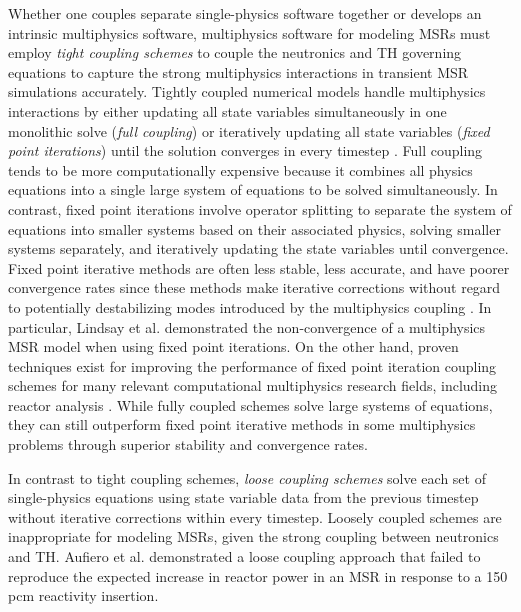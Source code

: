Whether one couples separate single-physics software together or develops an
intrinsic multiphysics software, multiphysics software for modeling \glspl{MSR} must employ
\textit{tight coupling schemes} to couple the neutronics
and \gls{TH} governing equations to capture the strong
multiphysics interactions in transient \gls{MSR} simulations accurately. Tightly coupled
numerical models handle multiphysics interactions by either updating all state
variables simultaneously in one monolithic solve (\textit{full coupling}) or
iteratively updating all state variables (\textit{fixed point iterations})
until the solution converges in every timestep \cite{keyes_multiphysics_2013}.
Full coupling tends to be more computationally expensive because it combines
all physics equations into a single large system of equations to be solved
simultaneously. In contrast, fixed point iterations involve operator splitting to
separate the system of equations into smaller systems based on their associated
physics, solving smaller systems separately, and iteratively updating the state
variables until convergence. Fixed point iterative methods are often less
stable, less accurate, and have poorer
convergence rates since these methods make iterative corrections
without regard to potentially destabilizing modes introduced by the
multiphysics coupling \cite{keyes_multiphysics_2013}. In particular, Lindsay et al.
\cite{lindsay_introduction_2018} demonstrated the non-convergence of a multiphysics \gls{MSR}
model when using fixed point iterations. On the other hand, proven
techniques exist for improving the performance of fixed point iteration
coupling schemes for many relevant computational multiphysics research fields,
including reactor analysis \cite{ragusa_consistent_2009}. While fully coupled
schemes solve large systems of equations, they can still outperform
fixed point iterative methods in some multiphysics problems through superior
stability and convergence rates. 

In contrast to tight coupling schemes, \textit{loose coupling schemes}
solve each set of single-physics equations using state variable
data from the previous timestep without iterative corrections within every
timestep. Loosely coupled schemes are inappropriate for modeling \glspl{MSR},
given the strong coupling between neutronics and \gls{TH}.
Aufiero et al. \cite{aufiero_development_2014} demonstrated a loose coupling
approach that failed to reproduce the expected increase in reactor power
in an \gls{MSR} in response to a 150 pcm reactivity insertion.

